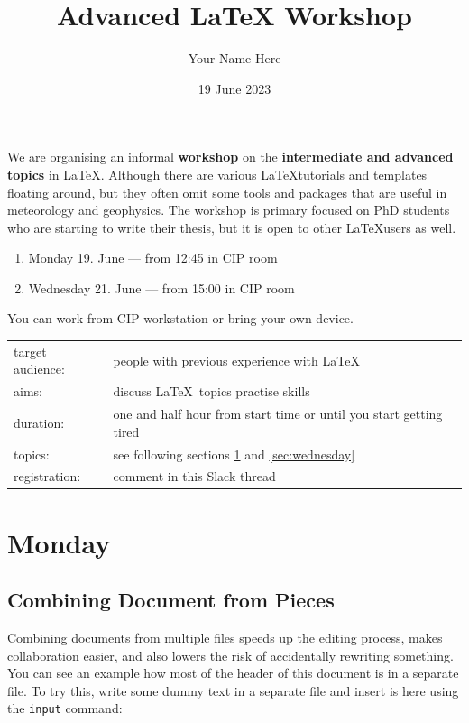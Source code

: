 \documentclass[a4paper,10pt]{report} %
\title{Advanced LaTeX Workshop}
\author{Your Name Here}
\date{19 June 2023}
\begin{document}


 \pagestyle{fancy}
\setcounter{page}{1}
 
 We are organising an informal \textbf{workshop} on the \textbf{intermediate and advanced topics} in \LaTeX.
Although there are various \LaTeX tutorials and templates floating around, but they often omit some tools and packages that are useful in meteorology and geophysics. The workshop is primary focused on PhD students who are starting to write their thesis, but it is open to other \LaTeX users as well.
 \begin{enumerate}
 \item  Monday 19. June --- from 12:45 in CIP room 
 \item  Wednesday 21. June --- from 15:00 in CIP room
\end{enumerate}

\noindent
You can work from CIP workstation or bring your own device.~\\

 \begin{tabular}{l p{}}
   target audience: & people with previous experience with \LaTeX \\
   aims:  & discuss \LaTeX ~topics practise skills \\
   duration: & one and half hour from start time or until you start getting tired \\
   topics: & see following sections \ref{sec:monday} and \ref{sec:wednesday} \\
   registration: & comment in this Slack thread \\ 
 \end{tabular}

 
\section{Monday} \label{sec:monday}



\subsection{Combining Document from Pieces}
Combining documents from multiple files speeds up the editing process, makes collaboration easier, and also lowers the risk of accidentally rewriting something. You can see an example how most of the header of this document is in a separate file.
To try this, write some dummy text in a separate file and insert is here using the \texttt{input} command:\\
% 
\end{document}
